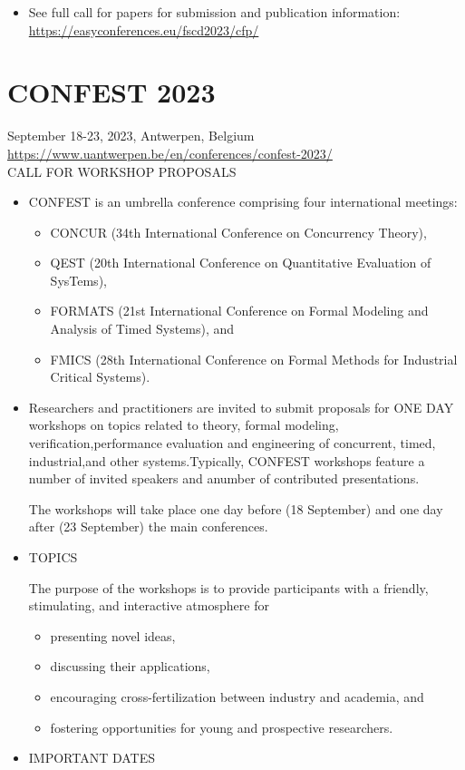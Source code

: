 \documentclass[prodmode,acmtecs]{acmsmall} %
\begin{document}
\begin{itemize}
\item  See full call for papers for submission and publication information: \href{https://easyconferences.eu/fscd2023/cfp/}{https://easyconferences.eu/fscd2023/cfp/} 
 
\end{itemize}\section{CONFEST 2023}\label{CONFEST2023}  September 18-23, 2023, Antwerpen, Belgium\\ 
  \href{https://www.uantwerpen.be/en/conferences/confest-2023/}{https://www.uantwerpen.be/en/conferences/confest-2023/}\\ 
CALL FOR WORKSHOP PROPOSALS 

\begin{itemize}\item  CONFEST is an umbrella conference comprising four international meetings: 
 
\begin{itemize}\item  CONCUR (34th International Conference on Concurrency Theory),
\item  QEST (20th International Conference on Quantitative Evaluation of SysTems),
\item  FORMATS (21st International Conference on Formal Modeling and Analysis of Timed Systems), and
\item  FMICS (28th International Conference on Formal Methods for Industrial Critical Systems).
\end{itemize} 
\item   Researchers and practitioners are invited to submit proposals for ONE DAY workshops on topics related to theory, formal modeling, verification,performance evaluation and engineering of concurrent, timed, industrial,and other systems.Typically, CONFEST workshops feature a number of invited speakers and anumber of contributed presentations. 
 
  The workshops will take place one day before (18 September) and one day after (23 September) the main conferences. 
 
\item  TOPICS 
 
  The purpose of the workshops is to provide participants with a friendly, stimulating, and interactive atmosphere for 
 
\begin{itemize}\item  presenting novel ideas,
\item  discussing their applications,
\item  encouraging cross-fertilization between industry and academia, and
\item  fostering opportunities for young and prospective researchers.
\end{itemize} 
\item  IMPORTANT DATES 
 

\end{itemize}
\end{document}
